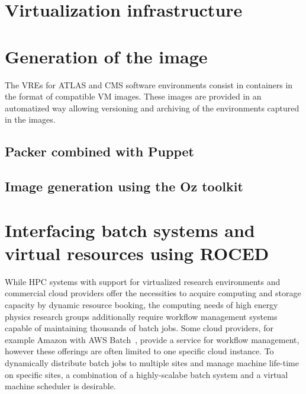 \section{Virtualization infrastructure}
\label{sec:openstack}


\section{Generation of the image}
The VREs for ATLAS and CMS software environments consist in \Openstack containers
in the format of compatible VM images.
These images are provided in an automatized
way allowing versioning and archiving of the environments captured in
the images.

\subsection{Packer combined with Puppet}





\subsection{Image generation using the Oz toolkit}





\section{Interfacing batch systems and virtual resources using ROCED}
\label{section:roced}
While HPC systems with support for virtualized research environments and commercial cloud providers offer the
necessities to acquire computing and storage capacity by dynamic
resource booking, the computing needs of high energy physics
re\-search groups ad\-di\-tion\-al\-ly require work\-flow
ma\-na\-ge\-ment sys\-tems capable of maintaining thousands of batch
jobs. Some cloud providers, for example Amazon with AWS
Batch~\cite{awsbatch}, provide a service for workflow management,
however these offerings are often limited to one specific cloud instance. To dynamically distribute batch jobs to multiple sites and manage machine life-time on specific sites, a combination of a highly-scalabe batch system and a virtual machine scheduler is desirable.

